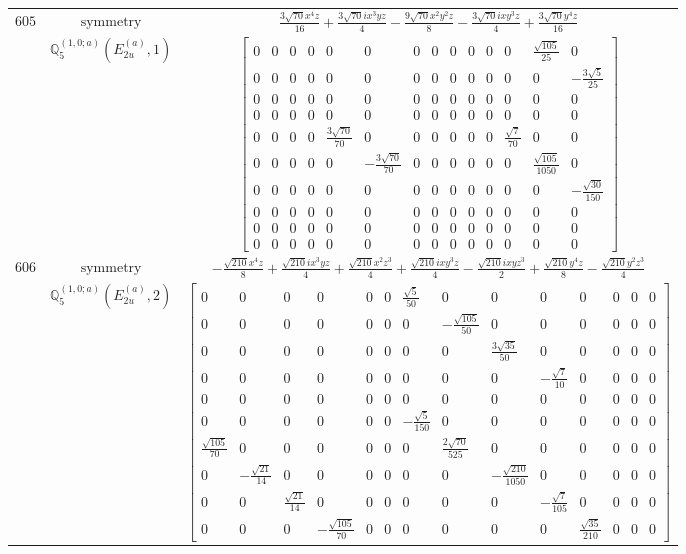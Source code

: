 \documentclass[fleqn,8pt,landscape]{jsarticle}
\begin{document}
\begin{longtable}{ccc}
$ 605 $ & $ \text{symmetry} $ & $ \frac{3 \sqrt{70} x^{4} z}{16} + \frac{3 \sqrt{70} i x^{3} y z}{4} - \frac{9 \sqrt{70} x^{2} y^{2} z}{8} - \frac{3 \sqrt{70} i x y^{3} z}{4} + \frac{3 \sqrt{70} y^{4} z}{16} $ \\
$  $ & $ \mathbb{Q}_{5}^{(1,0;a)}(E_{2u}^{(a)},1) $ & $ \begin{bmatrix} 0 & 0 & 0 & 0 & 0 & 0 & 0 & 0 & 0 & 0 & 0 & 0 & \frac{\sqrt{105}}{25} & 0 \\ 0 & 0 & 0 & 0 & 0 & 0 & 0 & 0 & 0 & 0 & 0 & 0 & 0 & - \frac{3 \sqrt{5}}{25} \\ 0 & 0 & 0 & 0 & 0 & 0 & 0 & 0 & 0 & 0 & 0 & 0 & 0 & 0 \\ 0 & 0 & 0 & 0 & 0 & 0 & 0 & 0 & 0 & 0 & 0 & 0 & 0 & 0 \\ 0 & 0 & 0 & 0 & \frac{3 \sqrt{70}}{70} & 0 & 0 & 0 & 0 & 0 & 0 & \frac{\sqrt{7}}{70} & 0 & 0 \\ 0 & 0 & 0 & 0 & 0 & - \frac{3 \sqrt{70}}{70} & 0 & 0 & 0 & 0 & 0 & 0 & \frac{\sqrt{105}}{1050} & 0 \\ 0 & 0 & 0 & 0 & 0 & 0 & 0 & 0 & 0 & 0 & 0 & 0 & 0 & - \frac{\sqrt{30}}{150} \\ 0 & 0 & 0 & 0 & 0 & 0 & 0 & 0 & 0 & 0 & 0 & 0 & 0 & 0 \\ 0 & 0 & 0 & 0 & 0 & 0 & 0 & 0 & 0 & 0 & 0 & 0 & 0 & 0 \\ 0 & 0 & 0 & 0 & 0 & 0 & 0 & 0 & 0 & 0 & 0 & 0 & 0 & 0 \end{bmatrix} $ \\ \hline
$ 606 $ & $ \text{symmetry} $ & $ - \frac{\sqrt{210} x^{4} z}{8} + \frac{\sqrt{210} i x^{3} y z}{4} + \frac{\sqrt{210} x^{2} z^{3}}{4} + \frac{\sqrt{210} i x y^{3} z}{4} - \frac{\sqrt{210} i x y z^{3}}{2} + \frac{\sqrt{210} y^{4} z}{8} - \frac{\sqrt{210} y^{2} z^{3}}{4} $ \\
$  $ & $ \mathbb{Q}_{5}^{(1,0;a)}(E_{2u}^{(a)},2) $ & $ \begin{bmatrix} 0 & 0 & 0 & 0 & 0 & 0 & \frac{\sqrt{5}}{50} & 0 & 0 & 0 & 0 & 0 & 0 & 0 \\ 0 & 0 & 0 & 0 & 0 & 0 & 0 & - \frac{\sqrt{105}}{50} & 0 & 0 & 0 & 0 & 0 & 0 \\ 0 & 0 & 0 & 0 & 0 & 0 & 0 & 0 & \frac{3 \sqrt{35}}{50} & 0 & 0 & 0 & 0 & 0 \\ 0 & 0 & 0 & 0 & 0 & 0 & 0 & 0 & 0 & - \frac{\sqrt{7}}{10} & 0 & 0 & 0 & 0 \\ 0 & 0 & 0 & 0 & 0 & 0 & 0 & 0 & 0 & 0 & 0 & 0 & 0 & 0 \\ 0 & 0 & 0 & 0 & 0 & 0 & - \frac{\sqrt{5}}{150} & 0 & 0 & 0 & 0 & 0 & 0 & 0 \\ \frac{\sqrt{105}}{70} & 0 & 0 & 0 & 0 & 0 & 0 & \frac{2 \sqrt{70}}{525} & 0 & 0 & 0 & 0 & 0 & 0 \\ 0 & - \frac{\sqrt{21}}{14} & 0 & 0 & 0 & 0 & 0 & 0 & - \frac{\sqrt{210}}{1050} & 0 & 0 & 0 & 0 & 0 \\ 0 & 0 & \frac{\sqrt{21}}{14} & 0 & 0 & 0 & 0 & 0 & 0 & - \frac{\sqrt{7}}{105} & 0 & 0 & 0 & 0 \\ 0 & 0 & 0 & - \frac{\sqrt{105}}{70} & 0 & 0 & 0 & 0 & 0 & 0 & \frac{\sqrt{35}}{210} & 0 & 0 & 0 \end{bmatrix} $ \\ \hline

\end{longtable}
\end{document}
